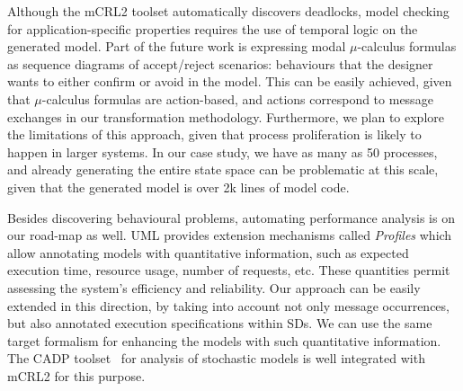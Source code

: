 \documentclass[letter]{llncs}
\newcommand{\secshrinkbegin}{\vspace{-.2cm}}
\begin{document}
Although the mCRL2 toolset automatically discovers deadlocks, model checking for application-specific properties 
requires the use of temporal logic on the generated model.
Part of the future work is expressing modal $\mu$-calculus formulas as sequence diagrams of accept/reject scenarios: 
behaviours that the designer wants to either confirm or avoid in the model. This can be easily achieved, given that
$\mu$-calculus formulas are action-based, and actions correspond to message exchanges in our transformation methodology.
Furthermore, we plan to explore the limitations of this approach, given that process proliferation is likely to happen
in larger systems. In our case study, we have as many as 50 processes, and already generating the entire state space can be problematic
at this scale, given that the generated model is over 2k lines of model code.

Besides discovering behavioural problems, automating performance analysis is on our road-map as well.
UML provides extension mechanisms called \emph{Profiles} which allow annotating models with quantitative information,
such as expected execution time, resource usage, number of requests, etc.
These quantities permit assessing the system's efficiency and reliability. Our approach can be easily extended
in this direction, by taking into account not only message occurrences, but also annotated execution specifications
within SDs. We can use the same target formalism for enhancing the models with such quantitative information.
The CADP toolset~\cite{GaravelLMS11} for analysis of stochastic models is well integrated with mCRL2 for this
purpose.
\secshrinkbegin
 
\vspace{-8 pt}

\end{document}
